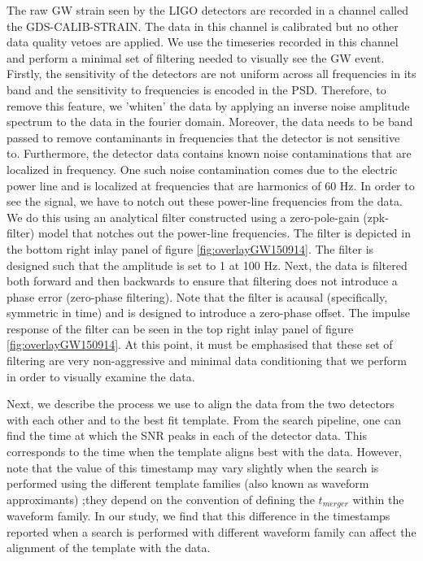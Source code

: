 The raw GW strain seen by the LIGO detectors are recorded in a channel called the GDS-CALIB-STRAIN. The data in this channel is calibrated but no other data quality vetoes are applied. We use the timeseries recorded in this channel and perform a minimal set of filtering needed to visually see the GW event. Firstly, the sensitivity of the detectors are not uniform across all frequencies in its band and the sensitivity to frequencies is encoded in the PSD.  Therefore, to remove this feature, we 'whiten' the data by applying an inverse noise amplitude spectrum to the data in the fourier domain.  Moreover, the data needs to be band passed to remove contaminants in frequencies that the detector is not sensitive to. Furthermore, the detector data contains known noise contaminations that are localized in frequency. One such noise contamination comes due to the electric power line and is localized at frequencies that are harmonics of 60 Hz. In order to see the signal, we have to notch out these power-line frequencies from the data. We do this using an analytical filter constructed using a zero-pole-gain (zpk-filter) model that notches out the power-line frequencies. The filter is depicted in the bottom right inlay panel of figure \ref{fig:overlayGW150914}. The filter is designed such that the amplitude is set to 1 at 100 Hz. Next, the data is filtered both forward and then backwards to ensure that filtering does not introduce a phase error (zero-phase filtering).  Note that the filter is acausal (specifically, symmetric in time) and is designed to introduce a zero-phase offset. The impulse response of the filter can be seen in the top right inlay panel of figure \ref{fig:overlayGW150914}. At this point, it must be emphasised that these set of filtering are very non-aggressive and minimal data conditioning that we perform in order to visually examine the data. 

Next, we describe the process we use to align the data from the two detectors with each other and to the best fit template. From the search pipeline, one can find the time at which the SNR peaks in each of the detector data. This corresponds to the time when the template aligns best with the data. However, note that the  value of this timestamp may vary slightly when the search is performed using the different template families (also known as waveform approximants) ;they depend on the convention of defining the $t_{merger}$ within the waveform family. In our study, we find that this difference in the timestamps reported when a search is performed with different waveform family can affect the alignment of the template with the data. 

